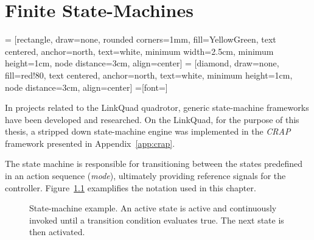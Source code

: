 \chapter{Finite State-Machines}
\label{cha:logic}
     = [rectangle, draw=none, rounded corners=1mm, fill=YellowGreen,
                    text centered, anchor=north, text=white, minimum width=2.5cm, minimum height=1cm, node distance=3cm, align=center]
     = [diamond, draw=none, fill=red!80,
                    text centered, anchor=north, text=white, minimum height=1cm, node distance=3cm, align=center]
    =[font=\scriptsize]

    In projects related to the LinkQuad quadrotor, generic state-machine
    frameworks have been developed and researched\citep{Merz06,Wzorek11}.
    On the LinkQuad, for the purpose of this thesis, a stripped down state-machine engine
    was implemented in the \textit{CRAP} framework presented in Appendix~\ref{app:crap}.

    The state machine is responsible for transitioning between the
    states predefined in an action sequence (\textit{mode}), ultimately
    providing reference signals for the controller. Figure~\ref{fig:logic:statemachine}
    examplifies the notation used in this chapter.

    \begin{figure}[H]
        \noindent{}
        \caption{State-machine example. An active state is active and continuously invoked until a transition condition evaluates true. The next state is then activated.}
        \label{fig:logic:statemachine}
    \end{figure}

